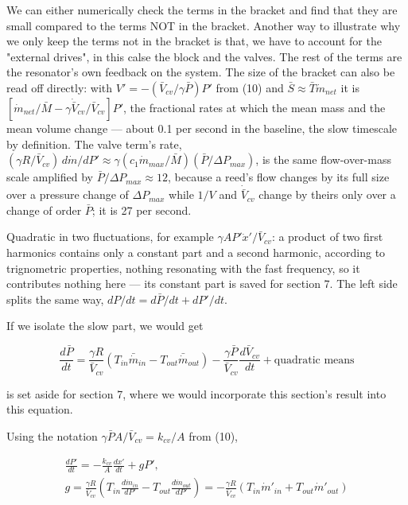 \documentclass[11pt]{article}
\begin{document}
We can either numerically check the terms in the bracket and find that they are small compared to the terms NOT in the bracket. Another way to illustrate why we only keep the terms not in the bracket is that, we have to account for the "external drives", in this calse the block and the valves. The rest of the terms are the resonator's own feedback on the system. The size of the bracket can also be read off directly: with $V' = -(\bar V_{cv}/\gamma\bar P)P'$ from (10) and $\bar S \approx \bar T\dot m_{net}$ it is $[\dot m_{net}/\bar M - \gamma\dot{\bar V}_{cv}/\bar V_{cv}]P'$, the fractional rates at which the mean mass and the mean volume change --- about 0.1 per second in the baseline, the slow timescale by definition. The valve term's rate, $(\gamma R/\bar V_{cv})\,d\dot m/dP' \approx \gamma(c_1\dot m_{max}/\bar M)(\bar P/\Delta P_{max})$, is the same flow-over-mass scale amplified by $\bar P/\Delta P_{max} \approx 12$, because a reed's flow changes by its full size over a pressure change of $\Delta P_{max}$ while $1/V$ and $\dot{\bar V}_{cv}$ change by theirs only over a change of order $\bar P$; it is 27 per second.

Quadratic in two fluctuations, for example $\gamma AP'\dot x'/\bar V_{cv}$: a product of two first harmonics contains only a constant part and a second harmonic, according to trignometric properties, nothing resonating with the fast frequency, so it contributes nothing here --- its constant part is saved for section 7. The left side splits the same way, $dP/dt = d\bar P/dt + dP'/dt$.

If we isolate the slow part, we would get

\[
\frac{d\bar P}{dt} = \frac{\gamma R}{\bar V_{cv}}\left(T_{in}\bar {\dot{m}}_{in} - T_{out}\bar {\dot{m}}_{out}\right) - \frac{\gamma\bar P}{\bar V_{cv}}\frac{d\bar V_{cv}}{dt} + \text{quadratic means}
\]

is set aside for section 7, where we would incorporate this section's result into this equation.

Using the notation $\gamma\bar PA/\bar V_{cv} = k_{cv}/A$ from (10),

\begin{equation}
\begin{gathered}
\frac{dP'}{dt} = -\frac{k_{cv}}{A}\frac{dx'}{dt} + gP', \\
g = \frac{\gamma R}{\bar V_{cv}}\left(T_{in}\frac{d\dot{m}_{in}}{dP'} - T_{out}\frac{d\dot{m}_{out}}{dP'}\right)
= -\frac{\gamma R}{\bar V_{cv}}\left(T_{in}\dot m'_{in} + T_{out}\dot m'_{out}\right)
\end{gathered} \tag{14}
\end{equation}
\end{document}
